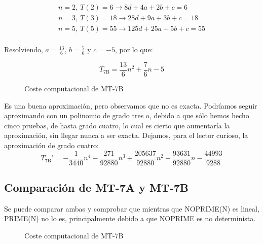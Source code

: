 \begin{subequations}
    \begin{gather*}
        n = 2,\ T(2) = 6  \rightarrow 8d + 4a  + 2b + c = 6 \\
        n = 3,\ T(3) = 18 \rightarrow 28d + 9a  + 3b + c = 18 \\
        n = 5,\ T(5) = 55 \rightarrow 125d + 25a + 5b + c = 55\\
    \end{gather*}
\end{subequations}

Resolviendo, $a=\frac{13}{6}$, $b=\frac{7}{6}$ y $c=-5$, por lo que:

\begin{equation}
    T_{\mathrm{7B}} = \frac{13}{6}n^2 + \frac{7}{6}n - 5
\end{equation}

\begin{figure}[H]
    \centering
    
    \caption{Coste computacional de MT-7B}
\end{figure}

Es una buena aproximación, pero observamos que no es exacta. Podríamos seguir aproximando con un polinomio de grado tres o, debido a que sólo hemos hecho cinco pruebas, de hasta grado cuatro, lo cual es cierto que aumentaría la aproximación, sin llegar nunca a ser exacta. Dejamos, para el lector curioso, la aproximación de grado cuatro:
\begin{equation}
    T_{\mathrm{7B}}' = - \frac{1}{3440}n^4 - \frac{271}{92880}n^3 + \frac{205637}{92880}n^2 + \frac{93631}{92880}n - \frac{44993}{9288}
\end{equation}



\subsection{Comparación de MT-7A y MT-7B}

Se puede comparar ambas y comprobar que mientras que NOPRIME(N) es lineal, PRIME(N) no lo es, principalmente debido a que NOPRIME es no determinista.

\begin{figure}[H]
    \centering
    
    \caption{ Coste computacional de MT-7B}
\end{figure}